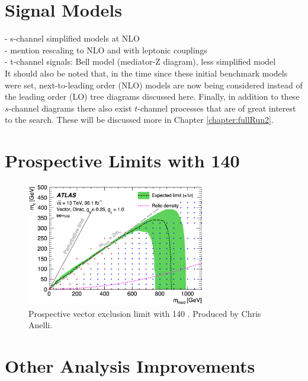 \section{Signal Models}
- s-channel simplified models at NLO\\
- mention rescaling to NLO and with leptonic couplings\\

- t-channel signals: Bell model (mediator-Z diagram), less simplified model\\

It should also be noted that, in the time since these initial benchmark models were set, next-to-leading order (NLO) models are now being considered instead of the leading order (LO) tree diagrams discussed here. Finally, in addition to these $s$-channel diagrams there also exist $t$-channel processes that are of great interest to the \monoZ search. These will be discussed more in Chapter \ref{chapter:fullRun2}.

\section{Prospective Limits with 140 \ifb}

\begin{figure}[htb]
\centering
\includegraphics[width=0.7\textwidth]{Figures/140ifb.png}
\caption{Prospective vector exclusion limit with 140 \ifb. Produced by Chris Anelli.}
\label{fig:id}
\end{figure}

\section{Other Analysis Improvements}

